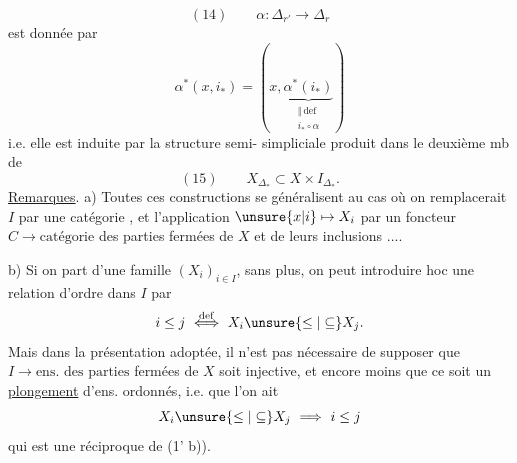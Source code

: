 \[
(14)\qquad\alpha:\Delta_{r'}\longrightarrow\Delta_r
\]
est donnée par
\[
\alpha^*(x,i_*)=(x,\underbrace{\alpha^*(i_*)}_{\substack{\Vert\,\mathrm{def}\\i_*\circ\alpha}})
\]
i.e. elle est induite par la structure semi-
simpliciale produit dans le deuxième mb de
\[
(15)\qquad X_{\Delta_*}\subset X\times I_{\Delta_*}.
\]
\uline{Remarques}. a) Toutes ces constructions se généralisent au
cas où on remplacerait  $I$ par une catégorie , et
l'application $\unsure{x|i}\mapsto X_i$ par un foncteur $C\longrightarrow\text{catégorie}$
des parties fermées de $X$ et de leurs inclusions
....

b) Si on part d'une famille $(X_i)_{i\in I}$,  sans
plus, on peut introduire  hoc une relation
d'ordre dans $I$ par 
\[
i\leq j\ \overset{\mathrm{def}}{\Longleftrightarrow}\ X_i\unsure{\leq|\subseteq}X_j.
\]
Mais dans la présentation adoptée, il n'est pas
nécessaire de supposer que  $I\longrightarrow\text{ens. des parties}$
fermées de $X$ soit injective, et encore moins
que ce soit un \uline{plongement} d'ens. ordonnés,
i.e. que l'on ait
\[
X_i\unsure{\leq|\subseteq}X_j\ \Longrightarrow\ i\leq j
\]
qui est une réciproque de (1' b)).
